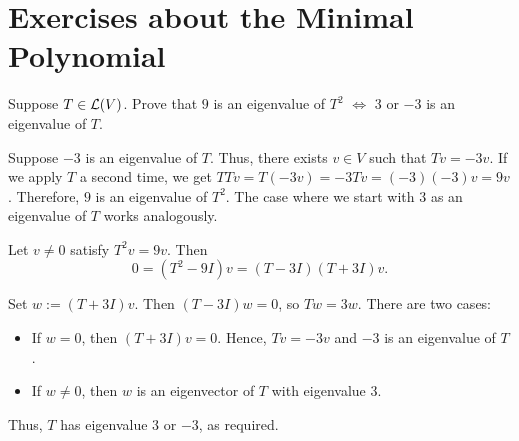 \section*{Exercises about the Minimal Polynomial}

\begin{xrcs}
  Suppose $T \in \mathcal{L}(V)$. Prove that $9$ is an eigenvalue of $T^2$ $\iff$ $3$ or $-3$ is an eigenvalue of $T$.

  \begin{xprf}
    \Leftarrowdirection Suppose $-3$ is an eigenvalue of $T$. Thus, there exists $v \in V$ such that $Tv = -3v$. If we apply $T$ a second time, we get $TT v = T (-3v) = -3 T v = (-3) (-3) v = 9v$. Therefore, $9$ is an eigenvalue of $T^2$. The case where we start with $3$ as an eigenvalue of $T$ works analogously.

    \Rightarrowdirection
    Let $v\neq 0$ satisfy $T^2v=9v$. Then
    \begin{equation}
      0=(T^2 - 9I) v = (T-3I) (T+3I) v.
    \end{equation}

    Set $w := (T+3I)v$. Then $(T-3I)w = 0$, so $Tw = 3w$. There are two cases:
    \begin{itemize}
      \item If $w=0$, then $(T + 3I) v = 0$. Hence, $Tv = -3v$ and $-3$ is an eigenvalue of $T$.
      \item If $w \neq 0$, then $w$ is an eigenvector of $T$ with eigenvalue $3$.
    \end{itemize}

    Thus, $T$ has eigenvalue $3$ or $-3$, as required.

%
  \end{xprf}
\end{xrcs}

